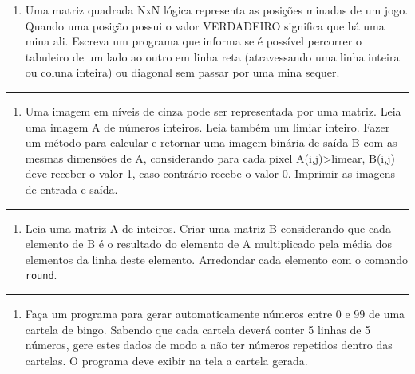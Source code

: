 \documentclass[12pt,a4paper]{article}
\providecommand{\tightlist}{%
      \setlength{\itemsep}{0pt}\setlength{\parskip}{0pt}}
\begin{document}
\begin{enumerate}
\def\labelenumi{\arabic{enumi}.}
\tightlist
\item
  Uma matriz quadrada NxN lógica representa as posições minadas de um
  jogo. Quando uma posição possui o valor VERDADEIRO significa que há
  uma mina ali. Escreva um programa que informa se é possível percorrer
  o tabuleiro de um lado ao outro em linha reta (atravessando uma linha
  inteira ou coluna inteira) ou diagonal sem passar por uma mina sequer.
\end{enumerate}

    \begin{center}\rule{0.5\linewidth}{0.5pt}\end{center}

\begin{enumerate}
\def\labelenumi{\arabic{enumi}.}
\setcounter{enumi}{1}
\tightlist
\item
  Uma imagem em níveis de cinza pode ser representada por uma matriz.
  Leia uma imagem A de números inteiros. Leia também um limiar inteiro.
  Fazer um método para calcular e retornar uma imagem binária de saída B
  com as mesmas dimensões de A, considerando para cada pixel
  A(i,j)\textgreater limear, B(i,j) deve receber o valor 1, caso
  contrário recebe o valor 0. Imprimir as imagens de entrada e saída.
\end{enumerate}

    \begin{center}\rule{0.5\linewidth}{0.5pt}\end{center}

\begin{enumerate}
\def\labelenumi{\arabic{enumi}.}
\setcounter{enumi}{2}
\tightlist
\item
  Leia uma matriz A de inteiros. Criar uma matriz B considerando que
  cada elemento de B é o resultado do elemento de A multiplicado pela
  média dos elementos da linha deste elemento. Arredondar cada elemento
  com o comando \texttt{round}.
\end{enumerate}

    \begin{center}\rule{0.5\linewidth}{0.5pt}\end{center}

\begin{enumerate}
\def\labelenumi{\arabic{enumi}.}
\setcounter{enumi}{3}
\tightlist
\item
  Faça um programa para gerar automaticamente números entre 0 e 99 de
  uma cartela de bingo. Sabendo que cada cartela deverá conter 5 linhas
  de 5 números, gere estes dados de modo a não ter números repetidos
  dentro das cartelas. O programa deve exibir na tela a cartela gerada.
\end{enumerate}
\end{document}
